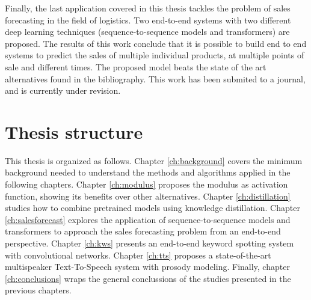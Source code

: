 Finally, the last application covered in this thesis tackles the problem of sales forecasting in the field of logistics. Two end-to-end systems with two different deep learning techniques (sequence-to-sequence models and transformers) are proposed. The results of this work conclude that it is possible to build end to end systems to predict the sales of multiple individual products, at multiple points of sale and different times. The proposed model beats the state of the art alternatives found in the bibliography. This work has been submited to a journal, and is currently under revision.

\section{Thesis structure}
This thesis is organized as follows. Chapter \ref{ch:background} covers the minimum background needed to understand the methods and algorithms applied in the following chapters. Chapter \ref{ch:modulus} proposes the modulus as activation function, showing its benefits over other alternatives. Chapter \ref{ch:distillation} studies how to combine pretrained models using knowledge distillation. Chapter \ref{ch:salesforecast} explores the application of sequence-to-sequence models and transformers to approach the sales forecasting problem from an end-to-end perspective. Chapter \ref{ch:kws} presents an end-to-end keyword spotting system with convolutional networks. Chapter \ref{ch:tts} proposes a state-of-the-art multispeaker Text-To-Speech system with prosody modeling. Finally, chapter \ref{ch:conclusions} wraps the general conclussions of the studies presented in the previous chapters.


